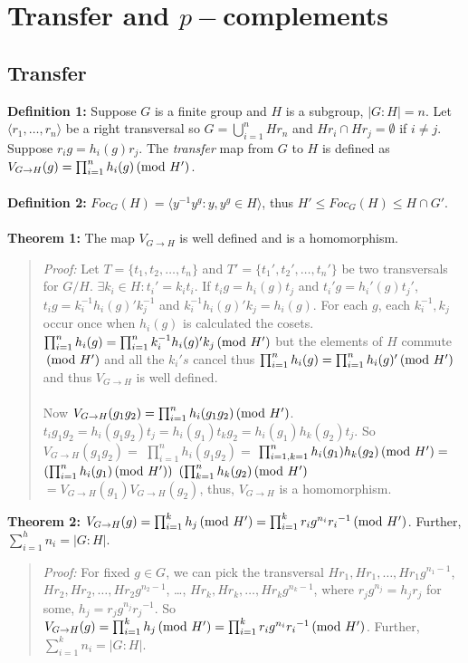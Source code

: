 \chapter{Transfer and $p-$complements}
\section{Transfer}
{\bf Definition 1:}  Suppose $G$ is a finite group and $H$ is a subgroup, $|G:H|=n$.  
Let $ \langle r_1, \ldots, r_n \rangle $ be a right transversal so $G= \bigcup_{i=1}^n Hr_n$ and
$Hr_i \cap Hr_j = \emptyset$ if $i \ne j$.  Suppose $r_i g= h_i(g) r_j$.
The \emph {transfer} map from $G$ to $H$ is defined as 
$V_{G \rightarrow H}(g)= \prod_{i=1}^n h_i(g) \thinspace \textnormal{(mod } H' \textnormal{)}$.
\\
\\
{\bf Definition 2:} $Foc_G(H)= \langle y^{-1} y^g: y, y^g \in H \rangle $, 
thus $H' \le Foc_G(H) \le H \cap G'$.
\\
\\
{\bf Theorem 1:}
The map $V_{G \rightarrow H}$ is well defined and is a homomorphism.
\begin{quote}
\emph{Proof:}  
Let 
$T= \{ t_1 , t_2 , \ldots , t_n \}$ and
$T'= \{ t_1' , t_2' , \ldots , t_n' \}$ be two transversals for $G/H$.
$\exists k_i \in H: t_i'= k_i t_i$.  If 
$t_i g = h_i(g) t_j$ and
$t_i' g = h_i'(g) t_j'$, $t_i g= k_i^{-1} h_i(g)' k_j^{-1}$ and $k_i^{-1} h_i(g)' k_j = h_i(g)$.
For each $g$, each $k_i^{-1}, k_j$ occur once when $h_i(g)$ is calculated the cosets.
$\prod_{i=1}^n h_i(g) = \prod_{i=1}^n k_i^{-1} h_i(g)' k_j \thinspace \textnormal{(mod } H' \textnormal{)}$ but the elements of $H$
commute $\thinspace \textnormal{(mod } H' \textnormal{)}$ and all the $k_i's$ cancel thus
$\prod_{i=1}^n h_i(g) = \prod_{i=1}^n  h_i(g)' \thinspace \textnormal{(mod } H' \textnormal{)}$ and 
thus $V_{G \rightarrow H}$ is well defined.
\\
\\
Now 
$V_{G \rightarrow H}(g_1 g_2)= \prod_{i=1}^n h_i(g_1 g_2) \thinspace \textnormal{(mod } H' \textnormal{)}$.
$t_i g_1 g_2 = h_i(g_1 g_2) t_j = h_i(g_1) t_k g_2 = h_i(g_1) h_k(g_2) t_j$. So
$V_{G \rightarrow H}(g_1 g_2) = $
$\prod_{i=1}^n h_i(g_1 g_2) =$ $ \prod_{i=1, k=1}^n h_i(g_1) h_k(g_2) \thinspace \textnormal{(mod } H' \textnormal{)} =$
$(\prod_{i=1}^n h_i(g_1) \thinspace \textnormal{(mod } H' \textnormal{)})$ $(\prod_{k=1}^n h_k(g_2) \thinspace \textnormal{(mod } H' \textnormal{)}$ 
$= V_{G \rightarrow H}(g_1) V_{G \rightarrow H}(g_2)$,
thus, $V_{G \rightarrow H}$ is a homomorphism.
\end{quote}
{\bf Theorem 2:} 
$V_{G \rightarrow H}(g)= \prod_{i=1}^k  h_j \thinspace \textnormal{(mod } H' \textnormal{)}
= \prod_{i=1}^k  r_i g^{n_i}{r_i}^{-1} \thinspace \textnormal{(mod } H' \textnormal{)}$.  Further, $\sum_{i=1}^h n_i = |G:H|$.
\begin{quote}
\emph{Proof:}  
For fixed $g \in G$, we can pick the transversal 
$Hr_1, H r_1, \ldots, H r_1 g^{n_1 -1}$,
$Hr_2, H r_2, \ldots, H r_2 g^{n_2 -1}$, \ldots,
$Hr_k, H r_k, \ldots, H r_k g^{n_k -1}$, where $r_j g^{n_j} = h_j r_j$ for
some, $h_j= r_j g^{n_j}{r_j}^{-1}$. So
$V_{G \rightarrow H}(g)= \prod_{i=1}^k  h_j \thinspace \textnormal{(mod } H' \textnormal{)}
= \prod_{i=1}^k  r_i g^{n_i}{r_i}^{-1} \thinspace \textnormal{(mod } H' \textnormal{)}$.  Further, $\sum_{i=1}^k n_i = |G:H|$.
\end{quote}
